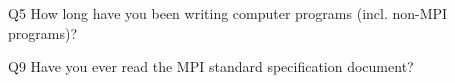 \begin{description}%
\item{Q5} How long have you been writing computer programs (incl. non-MPI programs)?%
\item{Q9} Have you ever read the MPI standard specification document?%
\end{description}%
